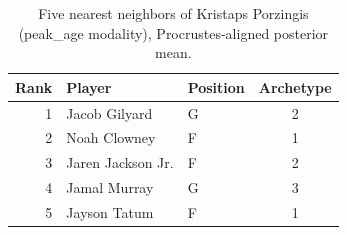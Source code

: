 \begin{table}[htbp]
  \centering\small
  \begin{tabular}{rllc}
    \toprule
    Rank & Player & Position & Archetype \\
    \midrule
    1 & Jacob Gilyard & G & 2 \\
    2 & Noah Clowney & F & 1 \\
    3 & Jaren Jackson Jr. & F & 2 \\
    4 & Jamal Murray & G & 3 \\
    5 & Jayson Tatum & F & 1 \\
    \bottomrule
  \end{tabular}
  \caption{Five nearest neighbors of Kristaps Porzingis (peak_age modality), Procrustes-aligned posterior mean.}
  \label{tab:Kristaps_Porzingis_neighbors_peak_age}
\end{table}

